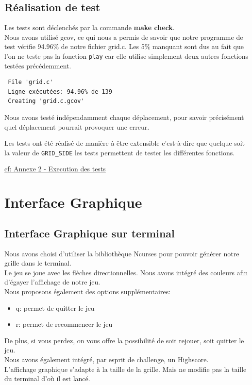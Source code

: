 \documentclass[a4paper]{article}
\begin{document}
 \subsection{Réalisation de test}
 \label{sec-3-3}

 Les tests sont déclenchés par la commande \textbf{make check}.
 \bigskip\\
 Nous avons utilisé gcov, ce qui nous a permis de savoir que notre
 programme de test vérifie 94.96\% de notre fichier grid.c.
 Les 5\% manquant sont dus au fait que l'on ne teste pas la fonction
 \texttt{play} car elle utilise simplement deux autres fonctions testées précédemment.

 \begin{verbatim}
 File 'grid.c'
 Ligne exécutées: 94.96% de 139
 Creating 'grid.c.gcov'
 \end{verbatim}
 \noindent
 Nous avons testé indépendamment chaque déplacement, pour savoir
 précisément quel déplacement pourrait provoquer une erreur. 


 Les tests ont été réalisé de manière à être extensible c'est-à-dire
 que quelque soit la valeur de \texttt{GRID\_SIDE} les tests permettent de
 tester les différentes fonctions.

 \hyperref[sec-7-2]{cf: Annexe 2 - Execution des tests}
 \newpage
 \section{Interface Graphique}
 \label{sec-4}
 \subsection{Interface Graphique sur terminal}
 \label{sec-4-1}

 Nous avons choisi d'utiliser la bibliothèque Ncurses pour pouvoir
 générer notre grille dans le terminal.\\
 Le jeu se joue avec les flèches directionnelles. Nous avons intégré
 des couleurs afin d'égayer l'affichage de notre jeu.\\
 Nous proposons également des options supplémentaires:
 \begin{itemize}
 \item q: permet de quitter le jeu
 \item r: permet de recommencer le jeu
 \end{itemize}
 De plus, si vous perdez, on vous offre la possibilité de soit rejouer,
 soit quitter le jeu.\\
 Nous avons également intégré, par esprit de challenge, un Highscore. \\
 L'affichage graphique s'adapte à la taille de la grille. Mais ne
 modifie pas la taille du terminal d'où il est lancé.
\end{document}
